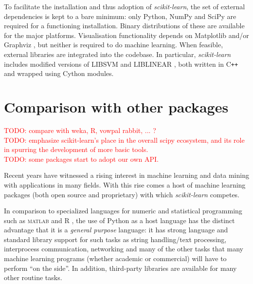 \documentclass{llncs}
\newcommand{\sklearn}{\textit{scikit-learn}\xspace}
\begin{document}
To facilitate the installation and thus adoption of \sklearn,
the set of external dependencies is kept to a bare minimum:
only Python, NumPy and SciPy are required for a functioning installation.
Binary distributions of these are available for the major platforms.
Visualisation functionality depends on Matplotlib \citep{hunter2007matplotlib}
and/or Graphviz \citep{gansner2000},
but neither is required to do machine learning.
When feasible, external libraries are integrated into the codebase.
In particular, \sklearn includes modified versions of \textsf{LIBSVM} and \textsf{LIBLINEAR}
\citep{chang2011libsvm,fan2008}, both written in C{}\verb!++!
and wrapped using Cython modules.

\section{Comparison with other packages}

\label{sec:comparison}

\textcolor{red}{TODO: compare with weka, R, vowpal rabbit, ... ?}\\
\textcolor{red}{TODO: emphasize scikit-learn's place in the overall scipy ecosystem, and its role in spurring the development of more basic tools.}\\
\textcolor{red}{TODO: some packages start to adopt our own API.}

Recent years have witnessed a rising interest in machine learning and data mining
with applications in many fields.
With this rise comes a host of machine learning packages
(both open source and proprietary) with which \sklearn competes.

In comparison to specialized languages for numeric and statistical programming
such as \textsc{matlab} and R \citep{r},
the use of Python as a host language has the distinct advantage
that it is a \textit{general purpose} language:
it has strong language and standard library support for such tasks as
string handling/text processing, interprocess communication, networking
and many of the other tasks that many machine learning programs
(whether academic or commercial)
will have to perform ``on the side''.
In addition, third-party libraries are available for many other routine tasks.
\end{document}
